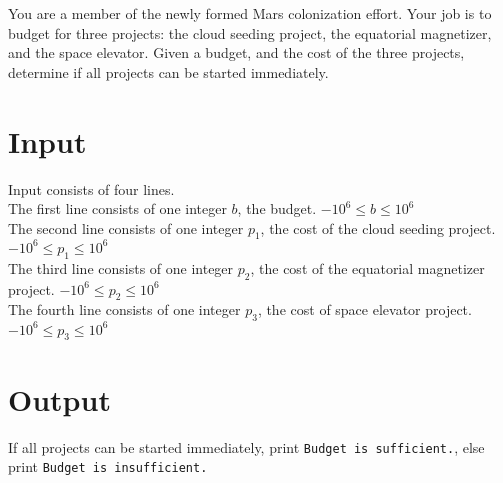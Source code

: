 
You are a member of the newly formed Mars colonization effort. Your job is to budget for three projects: the cloud seeding project, the equatorial magnetizer, and the space elevator. Given a budget, and the cost of the three projects, determine if all projects can be started immediately.

\section*{Input}
Input consists of four lines. \\
The first line consists of one integer $b$, the budget. $-10^6 \leq b \leq 10^6$ \\
The second line consists of one integer $p_1$, the cost of the cloud seeding project. $-10^6 \leq p_1 \leq 10^6$ \\
The third line consists of one integer $p_2$, the cost of the equatorial magnetizer project. $-10^6 \leq p_2 \leq 10^6$ \\
The fourth line consists of one integer $p_3$, the cost of space elevator project. $-10^6 \leq p_3 \leq 10^6$ \\

\section*{Output}
If all projects can be started immediately, print \texttt{Budget is sufficient.}, else print \texttt{Budget is insufficient.}
